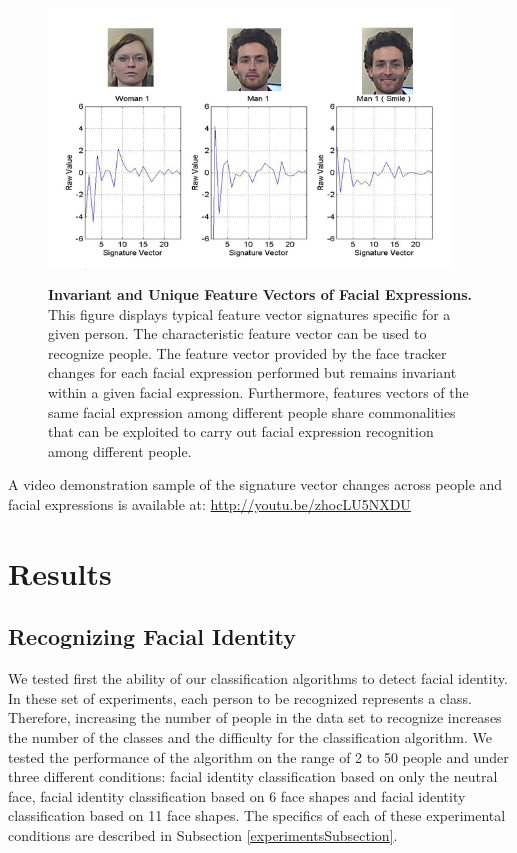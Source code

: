 \documentclass[]{article}
\begin{document}
\begin{figure}[ht]
\begin{center}
\vspace{-3mm}
\includegraphics[width=0.95\textwidth,height=75mm]{figures/comparationBetweenFaces2.jpg}
\end{center}
\caption{\textbf{Invariant and Unique Feature Vectors of Facial Expressions.} This figure displays typical feature 
vector signatures specific for a given person. The characteristic feature vector can be used to recognize people. The
feature vector provided by the face tracker changes for each facial expression performed but remains invariant within a
given facial expression. Furthermore, features vectors of the same facial expression among different people share commonalities that
can be exploited to carry out facial expression recognition among different people.}
\label{comparationBetweenFaces}
\end{figure}

A video demonstration sample of the signature vector changes across people and facial expressions is available at:
\url{ http://youtu.be/zhocLU5NXDU}

\section{Results}

\subsection{Recognizing Facial Identity}
We tested first the ability of our classification algorithms to detect facial identity. In these set of experiments,
each person to be recognized represents a class. Therefore, increasing the number of people in the data set to recognize
increases the number of the classes and the difficulty for the classification algorithm. We tested the performance of
the algorithm on the range of 2 to 50 people and under three different conditions: facial identity classification based
on only the neutral face, facial identity classification based on 6 face shapes and facial identity classification based
on 11 face shapes. The specifics of each of these experimental conditions are described in Subsection
\ref{experimentsSubsection}.
\end{document}
